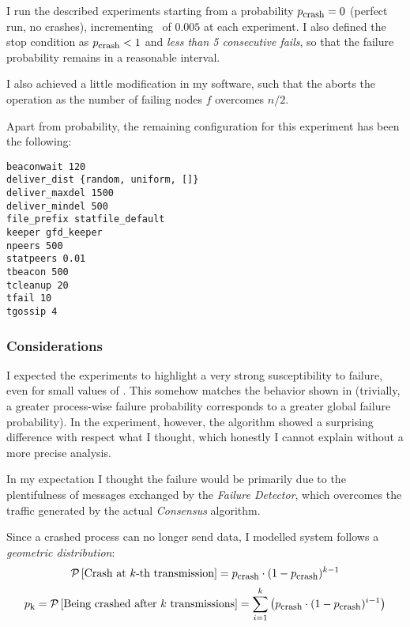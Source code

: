 
I run the described experiments starting from a probability ${p}_{\mbox{\footnotesize{crash}}} = 0$
(perfect run, no crashes), incrementing \PCrash\ of $0.005$ at each
experiment. I also defined the stop condition as ${p}_{\mbox{\footnotesize{crash}}} < 1$ and
\emph{less than 5 consecutive fails}, so that the failure probability
remains in a reasonable interval.

I also achieved a little modification in my software, such that the
 aborts the operation as the number of failing nodes $f$
overcomes $n/2$.

Apart from probability, the remaining configuration for this experiment
has been the following:
\begin{verbatim}
beaconwait 120
deliver_dist {random, uniform, []}
deliver_maxdel 1500
deliver_mindel 500
file_prefix statfile_default
keeper gfd_keeper
npeers 500
statpeers 0.01
tbeacon 500
tcleanup 20
tfail 10
tgossip 4
\end{verbatim}

\subsubsection{Considerations} \label{subsub:ManyRuns}

I expected the experiments to highlight a very strong susceptibility to
failure, even for small values of \PCrash. This somehow matches the
behavior shown in  (trivially, a greater process-wise
failure probability corresponds to a greater global failure probability).
In the experiment, however, the algorithm showed a surprising difference
with respect what I thought, which honestly I cannot explain without a
more precise analysis.

In my expectation I thought the failure would be primarily due to the
plentifulness of messages exchanged by the \emph{Failure Detector}, which
overcomes the traffic generated by the actual \emph{Consensus} algorithm.

Since a crashed process can no longer send data, I modelled system follows
a \emph{geometric distribution}:
\[
\mathcal{P}\left[{\mbox{Crash at $k$-th transmission}}\right] =
    {p}_{\mbox{\footnotesize{crash}}} \cdot (1 - {p}_{\mbox{\footnotesize{crash}}})^{k - 1}
\]\[
{p}_{\mbox{\footnotesize{k}}} =
\mathcal{P}\left[{\mbox{Being crashed after $k$ transmissions}}\right] =
    \sum_{i = 1}^{k}\left( {p}_{\mbox{\footnotesize{crash}}} \cdot (1 - {p}_{\mbox{\footnotesize{crash}}})^{i - 1} \right)
\]

